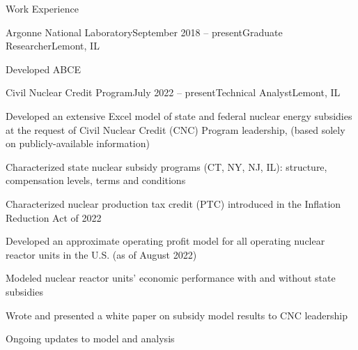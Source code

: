 \documentclass{resume} %
\begin{document}

\begin{rSection}{Work Experience}

\begin{rSubsection}{Argonne National Laboratory}{September 2018 -- present}{Graduate Researcher}{Lemont, IL}
  \item Developed ABCE
\end{rSubsection}

\begin{rSubsection}{Civil Nuclear Credit Program}{July 2022 -- present}{Technical Analyst}{Lemont, IL}
  \item Developed an extensive Excel model of state and federal nuclear energy subsidies at the request of Civil Nuclear Credit (CNC) Program leadership, (based solely on publicly-available information)
  \begin{list}{}
    \item Characterized state nuclear subsidy programs (CT, NY, NJ, IL): structure, compensation levels, terms and conditions
    \item Characterized nuclear production tax credit (PTC) introduced in the Inflation Reduction Act of 2022
    \item Developed an approximate operating profit model for all operating nuclear reactor units in the U.S. (as of August 2022)
    \item Modeled nuclear reactor units' economic performance with and without state subsidies
  \end{list}
  \item Wrote and presented a white paper on subsidy model results to CNC leadership
  \item Ongoing updates to model and analysis
\end{rSubsection}


\end{rSection}
\end{document}
